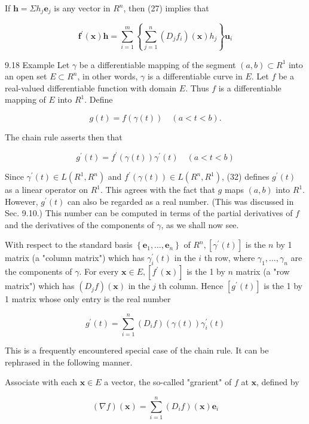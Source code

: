 \documentclass[10pt]{article}
\begin{document}
If $\mathbf{h}=\Sigma h_{j} \mathbf{e}_{j}$ is any vector in $R^{n}$, then (27) implies that

$$
\mathbf{f}^{\prime}(\mathbf{x}) \mathbf{h}=\sum_{i=1}^{m}\left\{\sum_{j=1}^{n}\left(D_{j} f_{i}\right)(\mathbf{x}) h_{j}\right\} \mathbf{u}_{i}
$$

9.18 Example Let $\gamma$ be a differentiable mapping of the segment $(a, b) \subset R^{1}$ into an open set $E \subset R^{n}$, in other words, $\gamma$ is a differentiable curve in $E$. Let $f$ be a real-valued differentiable function with domain $E$. Thus $f$ is a differentiable mapping of $E$ into $R^{1}$. Define

$$
g(t)=f(\gamma(t)) \quad(a<t<b) .
$$

The chain rule asserts then that

$$
g^{\prime}(t)=f^{\prime}(\gamma(t)) \gamma^{\prime}(t) \quad(a<t<b)
$$

Since $\gamma^{\prime}(t) \in L\left(R^{1}, R^{n}\right)$ and $f^{\prime}(\gamma(t)) \in L\left(R^{n}, R^{1}\right)$, (32) defines $g^{\prime}(t)$ as a linear operator on $R^{1}$. This agrees with the fact that $g$ maps $(a, b)$ into $R^{1}$. However, $g^{\prime}(t)$ can also be regarded as a real number. (This was discussed in Sec. 9.10.) This number can be computed in terms of the partial derivatives of $f$ and the derivatives of the components of $\gamma$, as we shall now see.

With respect to the standard basis $\left\{\mathbf{e}_{1}, \ldots, \mathbf{e}_{n}\right\}$ of $R^{n},\left[\gamma^{\prime}(t)\right]$ is the $n$ by 1 matrix (a "column matrix") which has $\gamma_{i}^{\prime}(t)$ in the $i$ th row, where $\gamma_{1}, \ldots, \gamma_{n}$ are the components of $\gamma$. For every $\mathbf{x} \in E,\left[f^{\prime}(\mathbf{x})\right]$ is the 1 by $n$ matrix (a "row matrix") which has $\left(D_{j} f\right)(\mathbf{x})$ in the $j$ th column. Hence $\left[g^{\prime}(t)\right]$ is the 1 by 1 matrix whose only entry is the real number

$$
g^{\prime}(t)=\sum_{i=1}^{n}\left(D_{i} f\right)(\gamma(t)) \gamma_{i}^{\prime}(t)
$$

This is a frequently encountered special case of the chain rule. It can be rephrased in the following manner.

Associate with each $\mathbf{x} \in E$ a vector, the so-called "grarient" of $f$ at $\mathbf{x}$, defined by

$$
(\nabla f)(\mathbf{x})=\sum_{i=1}^{n}\left(D_{i} f\right)(\mathbf{x}) \mathbf{e}_{i}
$$
\end{document}
